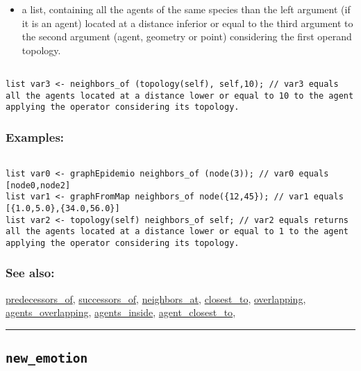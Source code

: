 \documentclass[]{book}
\providecommand{\tightlist}{%
  \setlength{\itemsep}{0pt}\setlength{\parskip}{0pt}}
\theoremstyle{definition}
\theoremstyle{definition}
\theoremstyle{definition}
\theoremstyle{remark}
\begin{document}
\begin{itemize}
\tightlist
\item
  a list, containing all the agents of the same species than the left
  argument (if it is an agent) located at a distance inferior or equal
  to the third argument to the second argument (agent, geometry or
  point) considering the first operand topology.
\end{itemize}

\begin{verbatim}
 
list var3 <- neighbors_of (topology(self), self,10); // var3 equals all the agents located at a distance lower or equal to 10 to the agent applying the operator considering its topology.
\end{verbatim}

\subsubsection{Examples:}\label{examples-254}

\begin{verbatim}
 
list var0 <- graphEpidemio neighbors_of (node(3)); // var0 equals [node0,node2] 
list var1 <- graphFromMap neighbors_of node({12,45}); // var1 equals [{1.0,5.0},{34.0,56.0}] 
list var2 <- topology(self) neighbors_of self; // var2 equals returns all the agents located at a distance lower or equal to 1 to the agent applying the operator considering its topology.
\end{verbatim}

\subsubsection{See also:}\label{see-also-147}

\href{OperatorsNR\#predecessors_of}{predecessors\_of},
\href{OperatorsSZ\#successors_of}{successors\_of},
\href{OperatorsNR\#neighbors_at}{neighbors\_at},
\href{OperatorsBC\#closest_to}{closest\_to},
\href{OperatorsNR\#overlapping}{overlapping},
\href{OperatorsAA\#agents_overlapping}{agents\_overlapping},
\href{OperatorsAA\#agents_inside}{agents\_inside},
\href{OperatorsAA\#agent_closest_to}{agent\_closest\_to},

\begin{center}\rule{0.5\linewidth}{\linethickness}\end{center}

\subsection{\texorpdfstring{\texttt{new\_emotion}}{new\_emotion}}\label{new_emotion}
\end{document}
